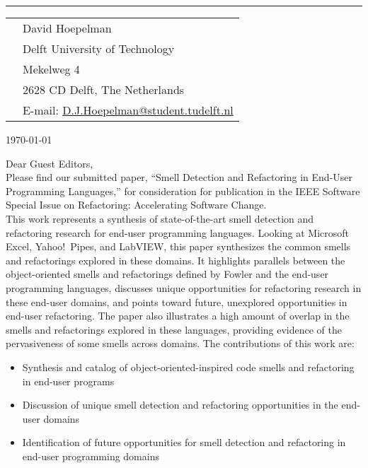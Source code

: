 \documentclass[9pt]{article}
\newcommand{\HRule}{\rule{\columnwidth}{0.25mm}}
\begin{document}
\vspace{-6pt}
\HRule

\vspace{20pt}

\begin{tabular}{p{3.90in}l}
&David Hoepelman\\
&Delft University of Technology\\
&Mekelweg 4\\
&2628 CD Delft, The Netherlands\\
& E-mail: \href{mailto:D.J.Hoepelman@student.tudelft.nl}{D.J.Hoepelman@student.tudelft.nl}\\
\end{tabular}

\vspace{20pt}

\begin{flushright}
\today
\end{flushright}

\vspace{20pt}

\noindent Dear Guest Editors,\\

\noindent Please find our submitted paper, ``Smell Detection and Refactoring in End-User Programming Languages,'' for consideration for publication in the IEEE Software Special Issue on Refactoring: Accelerating Software Change. \\

\noindent This work represents a synthesis of state-of-the-art smell detection and refactoring research for end-user programming languages. 
Looking at Microsoft Excel, Yahoo!\ Pipes, and LabVIEW, this paper synthesizes the common smells and refactorings explored in these domains. It highlights parallels between the object-oriented smells and refactorings defined by Fowler and the end-user programming languages, discusses unique opportunities for refactoring research in these end-user domains, and points toward future, unexplored opportunities in end-user refactoring. The paper also illustrates a high amount of overlap in the smells and refactorings explored in these languages, providing evidence of the pervasiveness of some smells across domains. The contributions of this work are:
\begin{itemize}
	\item Synthesis and catalog of object-oriented-inspired code smells  and refactoring in end-user programs
	\item Discussion of unique smell detection and refactoring opportunities in the end-user domains 
	\item Identification of future opportunities for smell detection and refactoring in end-user programming domains
\end{itemize}
\end{document}
